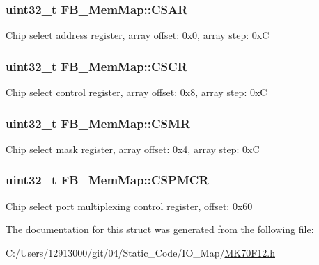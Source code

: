 \subsubsection[{C\+S\+A\+R}]{\setlength{\rightskip}{0pt plus 5cm}uint32\+\_\+t F\+B\+\_\+\+Mem\+Map\+::\+C\+S\+A\+R}\label{struct_f_b___mem_map_aa59ea1aff2f195dc7d41ef8611884381}
Chip select address register, array offset\+: 0x0, array step\+: 0x\+C \hypertarget{struct_f_b___mem_map_a7a1e48a5fde6382a076243009f5c0846}{}
\subsubsection[{C\+S\+C\+R}]{\setlength{\rightskip}{0pt plus 5cm}uint32\+\_\+t F\+B\+\_\+\+Mem\+Map\+::\+C\+S\+C\+R}\label{struct_f_b___mem_map_a7a1e48a5fde6382a076243009f5c0846}
Chip select control register, array offset\+: 0x8, array step\+: 0x\+C \hypertarget{struct_f_b___mem_map_a02c1e1542339e83d168a52e763f60228}{}
\subsubsection[{C\+S\+M\+R}]{\setlength{\rightskip}{0pt plus 5cm}uint32\+\_\+t F\+B\+\_\+\+Mem\+Map\+::\+C\+S\+M\+R}\label{struct_f_b___mem_map_a02c1e1542339e83d168a52e763f60228}
Chip select mask register, array offset\+: 0x4, array step\+: 0x\+C \hypertarget{struct_f_b___mem_map_a7876f1f5e2d0718968b09242af73b600}{}
\subsubsection[{C\+S\+P\+M\+C\+R}]{\setlength{\rightskip}{0pt plus 5cm}uint32\+\_\+t F\+B\+\_\+\+Mem\+Map\+::\+C\+S\+P\+M\+C\+R}\label{struct_f_b___mem_map_a7876f1f5e2d0718968b09242af73b600}
Chip select port multiplexing control register, offset\+: 0x60 

The documentation for this struct was generated from the following file\+:\begin{DoxyCompactItemize}
\item 
C\+:/\+Users/12913000/git/04/\+Static\+\_\+\+Code/\+I\+O\+\_\+\+Map/\hyperlink{_m_k70_f12_8h}{M\+K70\+F12.\+h}\end{DoxyCompactItemize}
